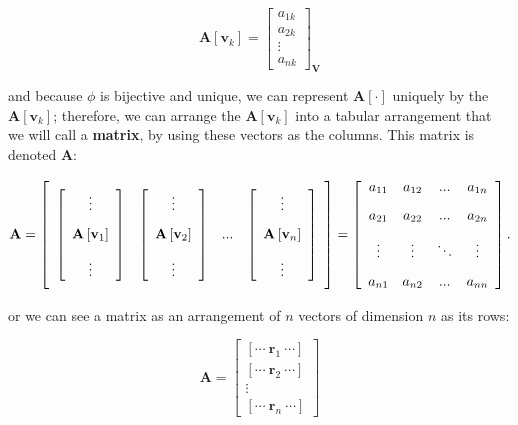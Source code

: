 \begin{equation} \mathbf{A}\left[\mathbf{v}_k\right] = \left[\begin{array}{c} a_{1k} \\[3mm] a_{2k} \\[3mm] \vdots \\[3mm] a_{nk} \end{array}\right]_\mathbf{V}\end{equation}

	\noindent and because $\phi$ is bijective and unique, we can represent $\mathbf{A}\left[\cdot\right]$ uniquely by the $\mathbf{A}\left[\mathbf{v}_k\right]$; therefore, we can arrange the $\mathbf{A}\left[\mathbf{v}_k\right]$ into a tabular arrangement that we will call a \textbf{matrix}, by using these vectors as the columns. This matrix is denoted $\mathbf{A}$:

\begin{equation} \mathbf{A} = \left[\raisebox{15mm}{} \begin{array}{cccc} \left[\begin{array}{c} \vdots \\[3mm] \mathbf{A}\left[\mathbf{v}_1\right] \\[3mm] \vdots \end{array}\right] & \left[\begin{array}{c} \vdots \\[3mm] \mathbf{A}\left[\mathbf{v}_2\right] \\[3mm] \vdots \end{array}\right] & ... & \left[\begin{array}{c} \vdots \\[3mm] \mathbf{A}\left[\mathbf{v}_n\right] \\[3mm] \vdots \end{array}\right]\end{array}\right] = \left[\begin{array}{cccc} a_{11} & a_{12} & ... & a_{1n} \\[3mm] a_{21} & a_{22} & ... & a_{2n} \\[3mm] \vdots & \vdots & \ddots & \vdots \\[3mm]  a_{n1} & a_{n2} & ... & a_{nn} \end{array}\right]  . \label{eq:tabular_arrangement}\end{equation}

	\noindent or we can see a matrix as an arrangement of $n$ vectors of dimension $n$ as its rows:

\begin{equation} \mathbf{A} = \left[\begin{array}{c} \left[\cdots\ \mathbf{r}_1\ \cdots \right] \\[5mm] \left[\cdots\ \mathbf{r}_2\  \cdots \right] \\[5mm]  \vdots  \\[5mm] \left[\cdots\ \mathbf{r}_n\ \cdots \right] \end{array}\right] \end{equation}


